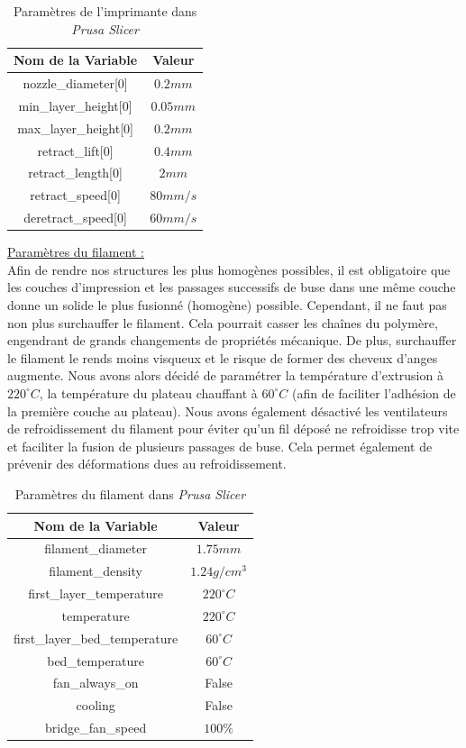 \documentclass[a4paper]{article}
\begin{document}
	\begin{table}[h]
		\centering
		\begin{tabular}{|c|c|}
			\hline
			\rowcolor{Gray}
			\textbf{Nom de la Variable} & \textbf{Valeur}\\
			\hline\hline
			nozzle\_diameter[0] & $0.2 mm$\\
			min\_layer\_height[0] & $0.05 mm$\\
			max\_layer\_height[0] & $0.2 mm$\\
			retract\_lift[0] & $0.4 mm$\\
			retract\_length[0] & $2 mm$\\
			retract\_speed[0] & $80 mm/s$\\
			deretract\_speed[0] & $60 mm/s$\\
			\hline
		\end{tabular}
		\caption{Paramètres de l'imprimante dans \textit{Prusa Slicer}}
	\end{table}

	\underline{Paramètres du filament :}\\
	
	Afin de rendre nos structures les plus homogènes possibles, il est obligatoire que les couches d'impression et les passages successifs de buse dans une même couche donne un solide le plus fusionné (homogène) possible. Cependant, il ne faut pas non plus surchauffer le filament. Cela pourrait casser les chaînes du polymère, engendrant de grands changements de propriétés mécanique. De plus, surchauffer le filament le rends moins visqueux et le risque de former des cheveux d'anges augmente. Nous avons alors décidé de paramétrer la température d'extrusion à $220 ^{\circ} C$, la température du plateau chauffant à $60 ^{\circ} C$ (afin de faciliter l'adhésion de la première couche au plateau). Nous avons également désactivé les ventilateurs de refroidissement du filament pour éviter qu'un fil déposé ne refroidisse trop vite et faciliter la fusion de plusieurs passages de buse. Cela permet également de prévenir des déformations dues au refroidissement.
	
	\begin{table}[h]
		\centering
		\begin{tabular}{|c|c|}
			\hline
			\rowcolor{Gray}
			\textbf{Nom de la Variable} & \textbf{Valeur}\\
			\hline\hline
			filament\_diameter & $1.75 mm$\\
			filament\_density & $1.24 g/cm^{3}$\\
			first\_layer\_temperature & $220 ^{\circ} C$\\
			temperature & $220 ^{\circ} C$\\
			first\_layer\_bed\_temperature & $60 ^{\circ} C$\\
			bed\_temperature & $60 ^{\circ} C$\\
			fan\_always\_on & False\\
			cooling & False\\
			bridge\_fan\_speed & $100 \%$\\
			\hline
		\end{tabular}
		\caption{Paramètres du filament dans \textit{Prusa Slicer}}
	\end{table}
	\newpage
	
\end{document}
